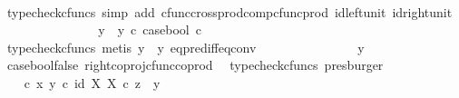 \begin{isabellebody}
\ \ \ \ \ \ \ \ \ \ \ \ \isamarkupfalse%
\ {\isacharparenleft}{\kern0pt}typecheck{\isacharunderscore}{\kern0pt}cfuncs{\isacharcomma}{\kern0pt}\ simp\ add{\isacharcolon}{\kern0pt}\ cfunc{\isacharunderscore}{\kern0pt}cross{\isacharunderscore}{\kern0pt}prod{\isacharunderscore}{\kern0pt}comp{\isacharunderscore}{\kern0pt}cfunc{\isacharunderscore}{\kern0pt}prod\ id{\isacharunderscore}{\kern0pt}left{\isacharunderscore}{\kern0pt}unit{}\ id{\isacharunderscore}{\kern0pt}right{\isacharunderscore}{\kern0pt}unit{}{\isacharparenright}{\kern0pt}\isanewline
\ \ \ \ \ \ \ \ \ \ \isamarkupfalse%
\ \isamarkupfalse%
\ {\isachardoublequoteopen}{\isachardot}{\kern0pt}{\isachardot}{\kern0pt}{\isachardot}{\kern0pt}\ {\isacharequal}{\kern0pt}\ {\isacharparenleft}{\kern0pt}y{}\ {\isasymamalg}\ y{}{\isacharparenright}{\kern0pt}\ {\isasymcirc}\isactrlsub c\ case{\isacharunderscore}{\kern0pt}bool\ {\isasymcirc}\isactrlsub c\ {\isasymf}{\isachardoublequoteclose}\isanewline
\ \ \ \ \ \ \ \ \ \ \ \ \isamarkupfalse%
\ {\isacharparenleft}{\kern0pt}typecheck{\isacharunderscore}{\kern0pt}cfuncs{\isacharcomma}{\kern0pt}\ metis\ {\isacartoucheopen}y\ {\isasymnoteq}\ y{}{\isacartoucheclose}\ eq{\isacharunderscore}{\kern0pt}pred{\isacharunderscore}{\kern0pt}iff{\isacharunderscore}{\kern0pt}eq{\isacharunderscore}{\kern0pt}conv{\isacharparenright}{\kern0pt}\isanewline
\ \ \ \ \ \ \ \ \ \ \isamarkupfalse%
\ \isamarkupfalse%
\ {\isachardoublequoteopen}{\isachardot}{\kern0pt}{\isachardot}{\kern0pt}{\isachardot}{\kern0pt}\ {\isacharequal}{\kern0pt}\ y{}{\isachardoublequoteclose}\isanewline
\ \ \ \ \ \ \ \ \ \ \ \ \isamarkupfalse%
\ case{\isacharunderscore}{\kern0pt}bool{\isacharunderscore}{\kern0pt}false\ right{\isacharunderscore}{\kern0pt}coproj{\isacharunderscore}{\kern0pt}cfunc{\isacharunderscore}{\kern0pt}coprod\ \isamarkupfalse%
\ {\isacharparenleft}{\kern0pt}typecheck{\isacharunderscore}{\kern0pt}cfuncs{\isacharcomma}{\kern0pt}\ presburger{\isacharparenright}{\kern0pt}\isanewline
\ \ \ \ \ \ \ \ \ \ \isamarkupfalse%
\ \isamarkupfalse%
\ {\isachardoublequoteopen}{\isacharparenleft}{\kern0pt}{\isasymTheta}\ {\isasymcirc}\isactrlsub c\ {\isasymlangle}x{\isacharcomma}{\kern0pt}\ y{\isasymrangle}{\isacharparenright}{\kern0pt}\isactrlsup {\isasymflat}\ {\isasymcirc}\isactrlsub c\ {\isasymlangle}id\ X{\isacharcomma}{\kern0pt}\ {\isasymbeta}\isactrlbsub X\isactrlesub {\isasymrangle}\ {\isasymcirc}\isactrlsub c\ z\ {\isacharequal}{\kern0pt}\ y{}{\isachardoublequoteclose}\isanewline

\end{isabellebody}

